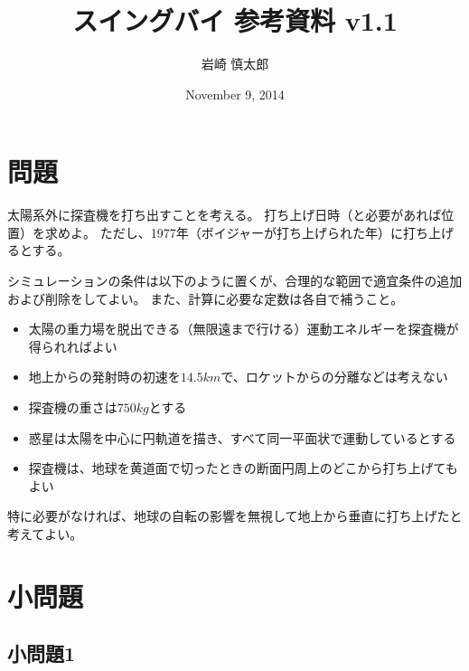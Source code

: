 \documentclass{article}
\title{ スイングバイ 参考資料 v1.1 }
\author{ 岩崎 慎太郎 }
\begin{document}
\date{November 9, 2014}
\maketitle

\section{ 問題 }

太陽系外に探査機を打ち出すことを考える。
打ち上げ日時（と必要があれば位置）を求めよ。
ただし、1977年（ボイジャーが打ち上げられた年）に打ち上げるとする。

シミュレーションの条件は以下のように置くが、合理的な範囲で適宜条件の追加および削除をしてよい。
また、計算に必要な定数は各自で補うこと。

\begin{itemize}
\item 太陽の重力場を脱出できる（無限遠まで行ける）運動エネルギーを探査機が得られればよい
\item 地上からの発射時の初速を$14.5km$で、ロケットからの分離などは考えない
\item 探査機の重さは$750kg$とする
\item 惑星は太陽を中心に円軌道を描き、すべて同一平面状で運動しているとする
\item 探査機は、地球を黄道面で切ったときの断面円周上のどこから打ち上げてもよい
\end{itemize}

特に必要がなければ、地球の自転の影響を無視して地上から垂直に打ち上げたと考えてよい。

\section{ 小問題 }

\subsection{ 小問題1 }
\end{document}
